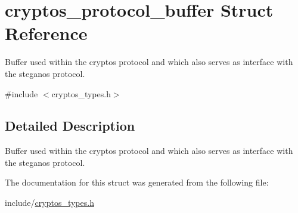 \hypertarget{structcryptos__protocol__buffer}{
\section{cryptos\_\-protocol\_\-buffer Struct Reference}
\label{structcryptos__protocol__buffer}
}


Buffer used within the cryptos protocol and which also serves as interface with the steganos protocol.  


{\ttfamily \#include $<$cryptos\_\-types.h$>$}

\subsection{Detailed Description}
Buffer used within the cryptos protocol and which also serves as interface with the steganos protocol. 

The documentation for this struct was generated from the following file:\begin{DoxyCompactItemize}
\item 
include/\hyperlink{cryptos__types_8h}{cryptos\_\-types.h}\end{DoxyCompactItemize}
